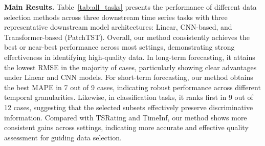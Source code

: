 \documentclass{article}
\newcommand{\partitle}[1]{\smallskip \noindent \textbf{#1.}}
\begin{document}
\partitle{Main Results}
Table~\ref{tab:all_tasks} presents the performance of different data selection methods across three downstream time series tasks with three representative downstream model architectures: Linear, CNN-based, and Transformer-based (PatchTST). Overall, our method consistently achieves the best or near-best performance across most settings, demonstrating strong effectiveness in identifying high-quality data. In long-term forecasting, it attains the lowest RMSE in the majority of cases, particularly showing clear advantages under Linear and CNN models. For short-term forecasting, our method obtains the best MAPE in 7 out of 9 cases, indicating robust performance across different temporal granularities. Likewise, in classification tasks, it ranks first in 9 out of 12 cases, suggesting that the selected subsets effectively preserve discriminative information. Compared with TSRating and TimeInf, our method shows more consistent gains across settings, indicating more accurate and effective quality assessment for guiding data selection.
\end{document}
